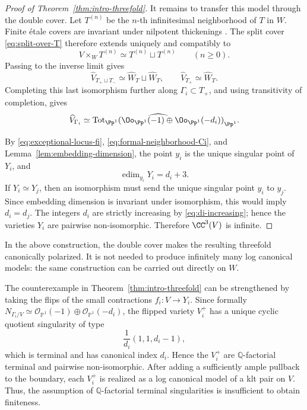\documentclass[12pt]{amsart}
\newcommand{\edim}{\operatorname{edim}}
\newcommand{\Tot}{\operatorname{Tot}}
\begin{document}
\begin{proof}[Proof of Theorem~\ref{thm:intro-threefold}]
It remains to transfer this model through the double cover. Let $T^{(n)}$ be the $n$-th infinitesimal neighborhood of $T$ in $W$. Finite \'etale covers are invariant under nilpotent thickenings \cite[\href{https://stacks.math.columbia.edu/tag/0BQB}{Tag~0BQB}]{Stacks}. The split cover \eqref{eq:split-over-T} therefore extends uniquely and compatibly to
\[
 V\times_WT^{(n)}\simeq T^{(n)}\sqcup T^{(n)}
 \qquad(n\geq0).
\]
Passing to the inverse limit gives
\[
 \widehat V_{T_+\sqcup T_-}\simeq\widehat W_T\sqcup\widehat W_T,
 \qquad
 \widehat V_{T_+}\simeq\widehat W_T.
\]
Completing this last isomorphism further along $\Gamma_i\subset T_+$, and using transitivity of completion, gives
\begin{equation}\label{eq:formal-neighborhood-Ci}
 \widehat V_{\Gamma_i}
 \simeq
 \widehat{\Tot_{\Pp^1}
 (\Oo_{\Pp^1}(-1)\oplus\Oo_{\Pp^1}(-d_i))}_{\Pp^1}.
\end{equation}

By \eqref{eq:exceptional-locus-fi}, \eqref{eq:formal-neighborhood-Ci}, and Lemma~\ref{lem:embedding-dimension}, the point $y_i$ is the unique singular point of $Y_i$, and
\[
 \edim_{y_i}Y_i=d_i+3.
\]
If $Y_i\simeq Y_j$, then an isomorphism must send the unique singular point $y_i$ to $y_j$. Since embedding dimension is invariant under isomorphism, this would imply $d_i=d_j$. The integers $d_i$ are strictly increasing by \eqref{eq:di-increasing}; hence the varieties $Y_i$ are pairwise non-isomorphic. Therefore $\CC^3(V)$ is infinite.
\end{proof}

\begin{remark}
In the above construction, the double cover makes the resulting threefold canonically
polarized. It is not needed to produce infinitely many log canonical
models: the same construction can be carried out directly
on \(W\).
\end{remark}

\begin{remark}\label{rmk:Q-fact and terminal not enough}
The counterexample in Theorem~\ref{thm:intro-threefold} can be strengthened by taking the flips of the small contractions $f_i\colon V\to Y_i$. Since formally \(N_{\Gamma_i/V}\simeq \mathcal O_{\mathbb P^1}(-1)\oplus\mathcal O_{\mathbb P^1}(-d_i)\), the flipped variety \(V_i^+\) has a unique cyclic quotient singularity of type
\[
\frac1{d_i}(1,1,d_i-1),
\]
which is terminal and has canonical index \(d_i\). Hence the \(V_i^+\) are \(\mathbb Q\)-factorial terminal and pairwise non-isomorphic. After adding a sufficiently ample pullback to the boundary, each \(V_i^+\) is realized as a log canonical model of a klt pair on \(V\). Thus, the assumption of \(\mathbb Q\)-factorial terminal singularities is insufficient to obtain finiteness.
\end{remark}
 


\end{document}
